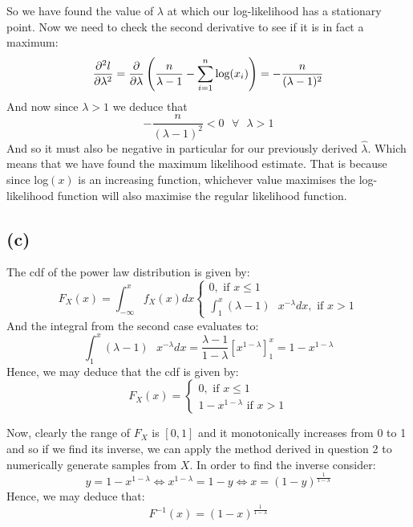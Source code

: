 \documentclass[12pt]{article}
\begin{document}
So we have found the value of $ \lambda $ at which our log-likelihood has a stationary point. Now we need to check the second derivative to see if it is in fact a maximum: 
\[ \pdv[2]{l}{\lambda} = \frac{\partial  }{\partial \lambda} \left(\frac{n}{\lambda - 1} - \sum_{i = 1}^{n} \text{log} (x_i) \right)
= - \frac{n}{(\lambda - 1)^2}\]
And now since $ \lambda > 1 $ we deduce that  
\[- \frac{n}{(\lambda - 1)^2} < 0 \text{ } \forall \text{ } \lambda > 1\] 
And so it must also be negative in particular for our previously derived $ \hat{\lambda} $.
Which means that we have found the maximum likelihood estimate. That is because since log$(x)$ is an increasing function, whichever value maximises the log-likelihood function will also maximise the regular likelihood function.

\subsection*{(c)}
The cdf of the power law distribution is given by:
\[ F_X(x) = \int_{-\infty}^{x} f_X(x)dx 
  \begin {cases}
  0, \text{ if } x \leq 1 \\
  \int_1^x (\lambda - 1) \text{ } x^{-\lambda}dx, \text{ if } x > 1
  \end {cases} 
\]
And the integral from the second case evaluates to:
\[ \int_1^x (\lambda - 1) \text{ } x^{-\lambda}dx 
  = \frac{\lambda - 1}{1 - \lambda} \left[ x^{ 1 - \lambda } \right]_1^x = 1 - x^{1 - \lambda}
\]
Hence, we may deduce that the cdf is given by:
\[ F_X(x) = 
  \begin {cases}
  0, \text{ if } x \leq 1 \\
  1 - x^{ 1 - \lambda} \text{ if } x > 1
  \end {cases} 
\]

Now, clearly the range of $ F_X $ is $ [0, 1] $ and it monotonically increases from 0 to 1 and so if we find its inverse, we can apply the method derived in question 2 to numerically generate samples from $ X $. In order to find the inverse consider:
\[ y = 1 - x^{1 - \lambda} \iff x^{1 - \lambda} = 1 - y \iff x = (1 - y)^{\frac{1}{1 - \lambda}} \]
Hence, we may deduce that:
\[ F^{-1} (x) = (1 -x)^{\frac{1}{1 - \lambda}}\]
\end{document}
